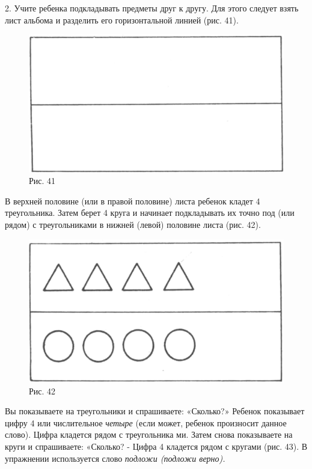 \documentclass{book}
\renewcommand{\emph}[1]{\textit{#1}}
\begin{document}
2. Учите ребенка подкладывать предметы друг к другу. Для этого следует
взять лист альбома и разделить его горизонтальной линией (рис. 41).

\begin{figure}
\centering
\includegraphics[width=\linewidth]{media/media/image37.png}
\caption*{Рис. 41}
\end{figure}

В верхней половине (или в правой половине) листа ребенок кладет 4
треугольника. Затем берет 4 круга и начинает подкладывать их точно под
(или рядом) с треугольниками в нижней (левой) половине листа (рис. 42).

\begin{figure}
\centering
\includegraphics[width=\linewidth]{media/media/image38.png}
\caption*{Рис. 42}
\end{figure}

Вы показываете на треугольники и спрашиваете: «Сколько?» Ребенок
показывает цифру 4 или числительное \emph{четыре} (если может, ребенок
произносит данное слово). Цифра кладется рядом с треугольника ми. Затем
снова показываете на круги и спрашиваете: «Сколько? - Цифра 4 кладется
рядом с кругами (рис. 43). В упражнении используется слово \emph{подложи
(подложи верно).}
\end{document}
